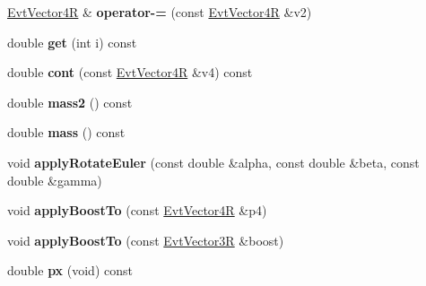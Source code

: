 \begin{DoxyCompactItemize}
\item 
\hypertarget{class_evt_vector4_r_a2104e7433943263c56f598eb67871d56}{}\hyperlink{class_evt_vector4_r}{Evt\+Vector4\+R} \& {\bfseries operator-\/=} (const \hyperlink{class_evt_vector4_r}{Evt\+Vector4\+R} \&v2)\label{class_evt_vector4_r_a2104e7433943263c56f598eb67871d56}

\item 
\hypertarget{class_evt_vector4_r_a6904c82cb10dd4791a93b792ae62a0b1}{}double {\bfseries get} (int i) const \label{class_evt_vector4_r_a6904c82cb10dd4791a93b792ae62a0b1}

\item 
\hypertarget{class_evt_vector4_r_a15c5b79e61e7ebb2ada3e83ca7817792}{}double {\bfseries cont} (const \hyperlink{class_evt_vector4_r}{Evt\+Vector4\+R} \&v4) const \label{class_evt_vector4_r_a15c5b79e61e7ebb2ada3e83ca7817792}

\item 
\hypertarget{class_evt_vector4_r_ac57d615b662f0e3766b7a63e647be953}{}double {\bfseries mass2} () const \label{class_evt_vector4_r_ac57d615b662f0e3766b7a63e647be953}

\item 
\hypertarget{class_evt_vector4_r_a987a1e6073f0cd0ef8a4037a23363fb7}{}double {\bfseries mass} () const \label{class_evt_vector4_r_a987a1e6073f0cd0ef8a4037a23363fb7}

\item 
\hypertarget{class_evt_vector4_r_abd76eab6c02dd6f9308d334652419b16}{}void {\bfseries apply\+Rotate\+Euler} (const double \&alpha, const double \&beta, const double \&gamma)\label{class_evt_vector4_r_abd76eab6c02dd6f9308d334652419b16}

\item 
\hypertarget{class_evt_vector4_r_ae0728f82ec494be716a68ff238270d30}{}void {\bfseries apply\+Boost\+To} (const \hyperlink{class_evt_vector4_r}{Evt\+Vector4\+R} \&p4)\label{class_evt_vector4_r_ae0728f82ec494be716a68ff238270d30}

\item 
\hypertarget{class_evt_vector4_r_af36e81b7a47ef3c71d963832a3ef7784}{}void {\bfseries apply\+Boost\+To} (const \hyperlink{class_evt_vector3_r}{Evt\+Vector3\+R} \&boost)\label{class_evt_vector4_r_af36e81b7a47ef3c71d963832a3ef7784}

\item 
\hypertarget{class_evt_vector4_r_a573748427ebfd455c188246a210b0f37}{}double {\bfseries px} (void) const \label{class_evt_vector4_r_a573748427ebfd455c188246a210b0f37}


\end{DoxyCompactItemize}
